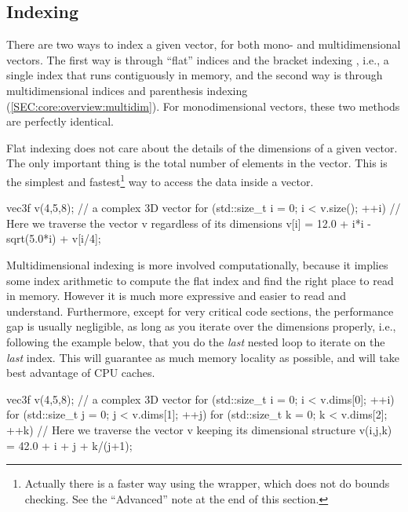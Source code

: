 \documentclass[12pt]{report}
\newenvironment{example}
{
    \begin{mdframed}[style=example,frametitle={Example}]
}
{
    \end{mdframed}
}
\begin{document}
\subsection{Indexing \label{SEC:core:vec:indexing}}

There are two ways to index a given vector, for both mono- and multidimensional vectors. The first way is through ``flat'' indices and the bracket indexing , i.e., a single index that runs contiguously in memory, and the second way is through multidimensional indices and parenthesis indexing  (\ref{SEC:core:overview:multidim}). For monodimensional vectors, these two methods are perfectly identical.

Flat indexing does not care about the details of the dimensions of a given vector. The only important thing is the total number of elements in the vector. This is the simplest and fastest\footnote{Actually there is a faster way using the  wrapper, which does not do bounds checking. See the ``Advanced'' note at the end of this section.} way to access the data inside a vector.

\begin{example}
\begin{cppcode}
vec3f v(4,5,8); // a complex 3D vector
for (std::size_t i = 0; i < v.size(); ++i) {
    // Here we traverse the vector v regardless of its dimensions
    v[i] = 12.0 + i*i - sqrt(5.0*i) + v[i/4];
}
\end{cppcode}
\end{example}

Multidimensional indexing is more involved computationally, because it implies some index arithmetic to compute the flat index and find the right place to read in memory. However it is much more expressive and easier to read and understand. Furthermore, except for very critical code sections, the performance gap is usually negligible, as long as you iterate over the dimensions properly, i.e., following the example below, that you do the \emph{last} nested loop to iterate on the \emph{last} index. This will guarantee as much memory locality as possible, and will take best advantage of CPU caches.

\begin{example}
\begin{cppcode}
vec3f v(4,5,8); // a complex 3D vector
for (std::size_t i = 0; i < v.dims[0]; ++i)
for (std::size_t j = 0; j < v.dims[1]; ++j)
for (std::size_t k = 0; k < v.dims[2]; ++k) {
    // Here we traverse the vector v keeping its dimensional structure
    v(i,j,k) = 42.0 + i + j + k/(j+1);
}
\end{cppcode}
\end{example}
\end{document}
